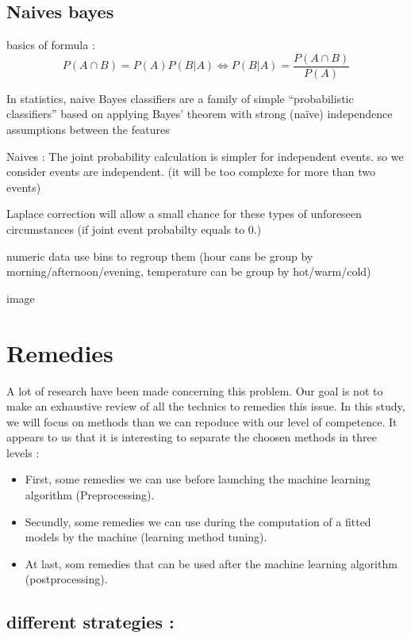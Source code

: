 \documentclass[
]{report}
\providecommand{\tightlist}{%
  \setlength{\itemsep}{0pt}\setlength{\parskip}{0pt}}
\begin{document}
\hypertarget{naives-bayes}{%
\section{Naives bayes}\label{naives-bayes}}

basics of formula : \[P(A ∩ B) = P(A) P(B|A) \iff P(B|A) = \frac{P(A ∩ B)}{P(A)}\]

In statistics, naive Bayes classifiers are a family of simple ``probabilistic classifiers'' based on applying Bayes' theorem with strong (naïve) independence assumptions between the features

Naives : The joint probability calculation is simpler for independent events. so we consider events are independent. (it will be too complexe for more than two events)

Laplace correction will allow a small chance for these types of unforeseen circumstances (if joint event probabilty equals to 0.)

numeric data use bins to regroup them (hour cans be group by morning/afternoon/evening, temperature can be group by hot/warm/cold)

image

\hypertarget{remedies}{%
\chapter{Remedies}\label{remedies}}

A lot of research have been made concerning this problem. Our goal is not to make an exhaustive review of all the technics to remedies this issue.
In this study, we will focus on methods than we can repoduce with our level of competence. It appears to us that it is interesting to separate the choosen methods in three levels :

\begin{itemize}
\tightlist
\item
  First, some remedies we can use before launching the machine learning algorithm (Preprocessing).
\item
  Secundly, some remedies we can use during the computation of a fitted models by the machine (learning method tuning).
\item
  At last, som remedies that can be used after the machine learning algorithm (postprocessing).
\end{itemize}

\hypertarget{different-strategies}{%
\section{different strategies :}\label{different-strategies}}
\end{document}
